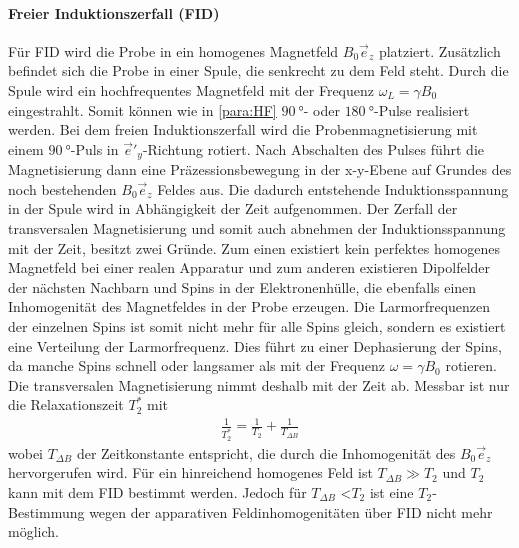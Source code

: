 \paragraph{Freier Induktionszerfall (FID)}
Für FID wird die Probe
in ein homogenes Magnetfeld $B_0\vec{e}_z$ platziert.
Zusätzlich befindet sich die Probe in einer
Spule, die senkrecht zu dem Feld steht.
Durch die Spule wird ein hochfrequentes Magnetfeld
mit der Frequenz $\omega_L=\gamma B_0$ eingestrahlt.
Somit können wie in \ref{para:HF} $\SI{90}{\degree}$- oder $\SI{180}{\degree}$-Pulse
realisiert werden.
Bei dem freien Induktionszerfall wird die Probenmagnetisierung mit einem
$\SI{90}{\degree}$-Puls in $\vec{e}'_y$-Richtung rotiert. Nach
Abschalten des Pulses
führt die Magnetisierung dann eine Präzessionsbewegung in der
x-y-Ebene auf Grundes des noch bestehenden $B_0\vec{e}_z$ Feldes aus.
Die dadurch entstehende Induktionsspannung in der Spule wird in Abhängigkeit der Zeit aufgenommen.
Der Zerfall der transversalen Magnetisierung und somit auch abnehmen der
Induktionsspannung mit der Zeit, besitzt zwei Gründe.
Zum einen existiert kein perfektes homogenes Magnetfeld bei einer
realen Apparatur und zum anderen
existieren Dipolfelder der nächsten Nachbarn und Spins in der Elektronenhülle,
die ebenfalls einen Inhomogenität des Magnetfeldes in der Probe erzeugen.
Die Larmorfrequenzen der einzelnen Spins ist somit nicht mehr für alle Spins
gleich, sondern es existiert eine Verteilung der Larmorfrequenz.
Dies führt zu einer Dephasierung
der Spins, da manche Spins schnell oder langsamer
als mit der Frequenz $\omega=\gamma B_0$ rotieren.
Die transversalen Magnetisierung nimmt deshalb mit der Zeit ab.
Messbar ist nur die Relaxationszeit $T_2^*$
mit
\begin{align}
  \frac{1}{T_2^*} = \frac{1}{T_2} + \frac{1}{T_{\Delta B}}
\end{align}
wobei $T_{\Delta B}$ der Zeitkonstante entspricht, die durch die Inhomogenität
des $B_0\vec{e}_z$ hervorgerufen wird.
Für ein hinreichend homogenes Feld ist $T_{\Delta B} \gg T_2$
und $T_2$ kann mit dem FID bestimmt werden.
Jedoch für $T_{\Delta B}$ \textless $T_2$ ist eine $T_2$-Bestimmung wegen
der apparativen Feldinhomogenitäten über FID nicht mehr möglich.

